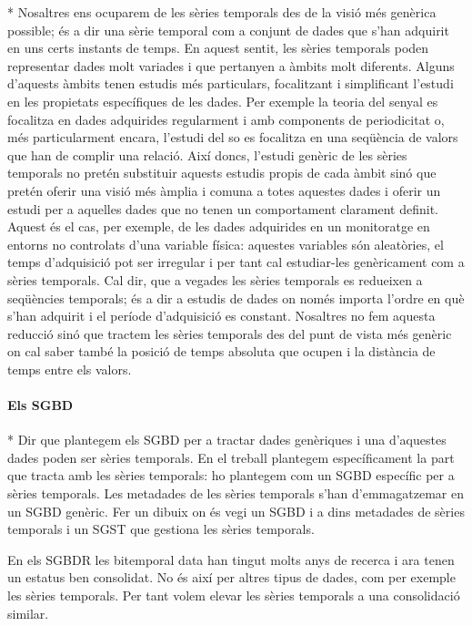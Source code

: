 * Nosaltres ens ocuparem de les sèries temporals des de la visió més
  genèrica possible; és a dir una sèrie temporal com a conjunt de
  dades que s'han adquirit en uns certs instants de temps.  En aquest
  sentit, les sèries temporals poden representar dades molt variades i
  que pertanyen a àmbits molt diferents. Alguns d'aquests àmbits tenen
  estudis més particulars, focalitzant i simplificant l'estudi en les
  propietats específiques de les dades. Per exemple la teoria del
  senyal es focalitza en dades adquirides regularment i amb components
  de periodicitat o, més particularment encara, l'estudi del so es
  focalitza en una seqüència de valors que han de complir una relació.
  Així doncs, l'estudi genèric de les sèries temporals no pretén
  substituir aquests estudis propis de cada àmbit sinó que pretén
  oferir una visió més àmplia i comuna a totes aquestes dades i oferir
  un estudi per a aquelles dades que no tenen un comportament
  clarament definit. Aquest és el cas, per exemple, de les dades
  adquirides en un monitoratge en entorns no controlats d'una variable
  física: aquestes variables són aleatòries, el temps d'adquisició pot
  ser irregular i per tant cal estudiar-les genèricament com a sèries
  temporals.  Cal dir, que a vegades les sèries temporals es redueixen
  a seqüències temporals; és a dir a estudis de dades on només importa
  l'ordre en què s'han adquirit i el període d'adquisició es
  constant. Nosaltres no fem aquesta reducció sinó que tractem les
  sèries temporals des del punt de vista més genèric on cal saber
  també la posició de temps absoluta que ocupen i la distància de
  temps entre els valors.





\paragraph{Els \gls{SGBD}}

* Dir que plantegem els SGBD per a tractar dades genèriques i una d'aquestes dades poden ser sèries temporals. En el treball plantegem específicament la part que tracta amb les sèries temporals: ho plantegem com un SGBD específic per a sèries temporals. Les metadades de les sèries temporals s'han d'emmagatzemar en un SGBD genèric. Fer un dibuix on és vegi un SGBD i a dins metadades de sèries temporals i un SGST que gestiona les sèries temporals.

En els SGBDR les bitemporal data han tingut molts anys de recerca i ara tenen un estatus ben consolidat. No és així per altres tipus de dades, com per exemple les sèries temporals. Per tant volem elevar les sèries temporals a una consolidació similar.

